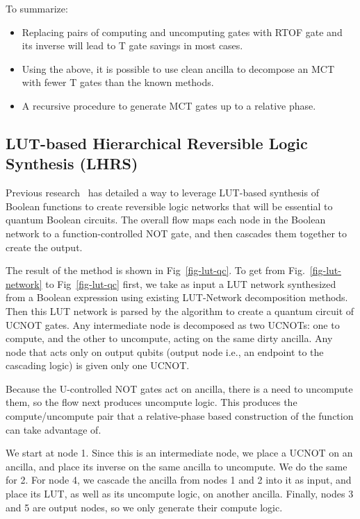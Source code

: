 To summarize:
\begin{itemize}
\item Replacing pairs of computing and uncomputing gates with RTOF gate and its inverse will lead to T gate savings in most cases.
\item Using the above, it is possible to use clean ancilla to decompose an MCT with fewer T gates than the known methods.
\item A recursive procedure to generate MCT gates up to a relative phase.
\end{itemize}

\subsection{LUT-based Hierarchical Reversible Logic Synthesis (LHRS)}
\label{Sec:lhrs}

Previous research~\cite{bib-lhrs-soeken} has detailed a way to leverage LUT-based synthesis of Boolean functions to create reversible logic networks that will be essential to quantum Boolean circuits. The overall flow maps each node in the Boolean network to a function-controlled NOT gate, and then cascades them together to create the output. 

The result of the method is shown in Fig~\ref{fig-lut-qc}. To get from Fig.~\ref{fig-lut-network} to Fig~\ref{fig-lut-qc} first, we take as input a LUT network synthesized from a Boolean expression using existing LUT-Network decomposition methods. Then this LUT network is parsed by the algorithm to create a quantum circuit of UCNOT gates. Any intermediate node is decomposed as two UCNOTs: one to compute, and the other to uncompute, acting on the same dirty ancilla. Any node that acts only on output qubits (output node i.e., an endpoint to the cascading logic) is given only one UCNOT.

Because the U-controlled NOT gates act on ancilla, there is a need to uncompute them, so the flow next produces uncompute logic. This produces the compute/uncompute pair that a relative-phase based construction of the function can take advantage of. 

\begin{example}
  \label{ex-lut}
  We start at node 1. Since this is an intermediate node, we place a
  UCNOT on an ancilla, and place its inverse on the same ancilla to
  uncompute. We do the same for 2. For node 4, we cascade the ancilla
  from nodes 1 and 2 into it as input, and place its LUT, as well as
  its uncompute logic, on another ancilla. Finally, nodes 3 and 5 are
  output nodes, so we only generate their compute logic. 

\end{example}


